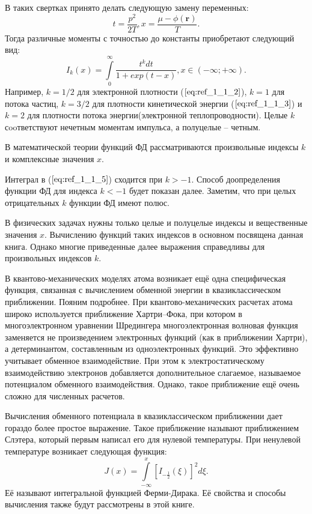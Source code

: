 В таких свертках принято делать следующую замену переменных:
\begin{equation}
t = \frac{p^2}{2T}, x = \frac{\mu - \phi(\textbf{r})}{T}.
\label{eq:ref_1_1_4}
\end{equation}
Тогда различные моменты с точностью до константы приобретают следующий вид:
\begin{equation}
I_k(x)=\int\limits_0^{\infty} \frac{t^kdt}{1+exp(t-x)}, x \in (-\infty ;+\infty).
\label{eq:ref_1_1_5}
\end{equation}
Например, $k = 1/2$ для электронной плотности ($\ref{eq:ref_1_1_2}$), $k = 1$ для потока частиц, $k = 3/2$ для плотности кинетической энергии ($\ref{eq:ref_1_1_3}$) и $k = 2$ для плотности потока энергии(электронной теплопроводности). Целые $k$ сooтветствуют нечетным моментам импульса, а полуцелые – четным.

В математической теории функций ФД рассматриваются произвольные индексы $k$ и комплексные значения $x$.

Интеграл в ($\ref{eq:ref_1_1_5}$) сходится при $k > -1$. Способ доопределения функции ФД для индекса $k < -1$ будет показан далее. Заметим, что при целых отрицательных $k$ функции ФД имеют полюс.

В физических задачах нужны только целые и полуцелые индексы и вещественные значения $x$. Вычислению функций таких индексов в основном посвящена данная книга. Однако многие приведенные далее выражения справедливы для произвольных индексов $k$.

В квантово-механических моделях атома возникает ещё одна
специфическая функция, связанная с вычислением обменной энергии в
квазиклассическом приближении. Пояним подробнее. При квантово-механических расчетах атома широко используется приближение Хартри–Фока, при котором в многоэлектронном уравнении Шредингера многоэлектронная волновая функция заменяется не произведением электронных функций (как в приближении Хартри), а детерминантом,
составленным из одноэлектронных функций. Это эффективно учитывает
обменное взаимодействие. При этом к электростатическому взаимодействию
электронов добавляется дополнительное слагаемое, называемое потенциалом
обменного взаимодействия. Однако, такое приближение ещё очень сложно для
численных расчетов.

Вычисления обменного потенциала в квазиклассическом приближении
дает гораздо более простое выражение. Такое приближение называют
приближением Слэтера, который первым написал его для нулевой
температуры. При ненулевой температуре возникает следующая функция:
\begin{equation}
J(x)=\int\limits_{-\infty}^x [I_{-\frac{1}{2}}(\xi)]^2d\xi.
\label{eq:ref_1_1_6}
\end{equation}
Её называют интегральной функцией Ферми-Дирака. Её свойства и способы вычисления также будут рассмотрены в этой книге. 
\\


